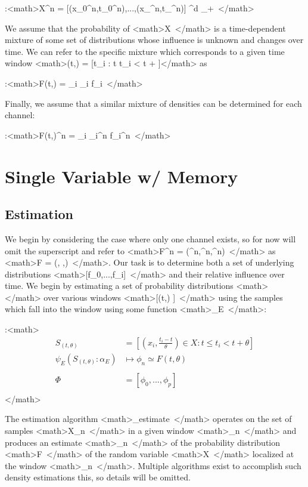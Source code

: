 \documentclass[11pt,twocolumn,titlepage]{article}
\begin{document}
:<math>X^n = [(x_0^n,t_0^n),...,(x_\ell^n,t_\ell^n)] \in {}^d \times {}_+ \,\!</math>


We assume that the probability of <math>X \,\!</math> is a time-dependent mixture of some set of distributions whose influence is unknown and changes over time.  We can refer to the specific mixture which corresponds to a given time window <math>(t,\theta) = [t_i : t \le t_i < t + \theta ]</math> as

:<math>F(t,\theta) = \sum_i \delta_i \cdot f_i \,\!</math>


Finally, we assume that a similar mixture of densities can be determined for each channel:

:<math>F(t,\theta)^n = \sum_i \delta_i^n \cdot f_i^n \,\!</math>

\section{Single Variable w/ Memory}
\subsection{Estimation}
We begin by considering the case where only one channel exists, so for now will omit the superscript and refer to <math>F^n = (\Omega^n,^n,^n) \,\!</math> as <math>F = (\Omega, ,) \,\!</math>.  Our task is to determine both a set of underlying distributions <math>[f_0,...,f_i] \,\!</math> and their relative influence over time.  We begin by estimating a set of probability distributions <math>\Phi \,\!</math> over various windows <math>[(t,\theta) \in {} ] \,\!</math> using the samples which fall into the window using some function <math>\psi_E \,\!</math>:

:<math>
\begin{align}
S_{(t,\theta)} &= [ (x_i,\frac{t_i - t}{\theta}) \in X : t \le t_i < t+\theta ] \\
\psi_E( S_{(t,\theta)}:\alpha_E ) &\mapsto \phi_n \simeq F(t,\theta)  \\
\\
\Phi &= [\phi_0,...,\phi_p ] \\
\end{align}
</math>


The estimation algorithm <math>\psi_{estimate} \,\!</math> operates on the set of samples <math>X_n \,\!</math> in a given window <math>_n \,\!</math> and produces an estimate <math>\phi_n \,\!</math> of the probability distribution <math>F \,\!</math> of the random variable <math>X \,\!</math> localized at the window <math>_n \,\!</math>.  Multiple algorithms exist to accomplish such density estimations this, so details will be omitted.
\end{document}
